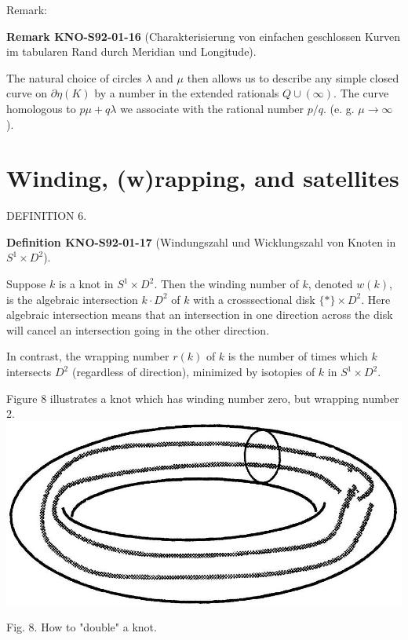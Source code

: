 \documentclass[10pt, letterpaper]{article}
\newcommand{\CustomHeading}[3]{%
  \par\medskip\noindent%
  \textbf{#1 #2} \textnormal{(#3)}.\enskip%
}
\newenvironment{DEF}[2]{\begin{unitbox}\CustomHeading{Definition}{#1}{#2}}{\end{unitbox}}
\newenvironment{REM}[2]{\begin{unitbox}\CustomHeading{Remark}{#1}{#2}}{\end{unitbox}}
\begin{document}
Remark: 

\begin{REM}{KNO-S92-01-16}{Charakterisierung von einfachen geschlossen Kurven im tabularen Rand durch Meridian und Longitude}
The natural choice of circles $\lambda$ and $\mu$ then allows us to describe any simple closed curve on $\partial \eta(K)$ by a number in the extended rationals $Q \cup(\infty)$. The curve homologous to $p \mu+q \lambda$ we associate with the rational number $p / q$. (e. g. $\mu \rightarrow \infty$ ).
\end{REM}



\section{Winding, (w)rapping, and satellites}


DEFINITION 6. 

\begin{DEF}{KNO-S92-01-17}{Windungszahl und Wicklungszahl von Knoten in $S^1\times D^2$}
Suppose $k$ is a knot in $S^{1} \times D^{2}$. Then the winding number of $k$, denoted $w(k)$, is the algebraic intersection $k \cdot D^{2}$ of $k$ with a crosssectional disk $\{*\} \times D^{2}$. Here algebraic intersection means that an intersection in one direction across the disk will cancel an intersection going in the other direction. 

In contrast, the wrapping number $r(k)$ of $k$ is the number of times which $k$ intersects $D^{2}$ (regardless of direction), minimized by isotopies of $k$ in $S^{1} \times D^{2}$.
\end{DEF}

Figure 8 illustrates a knot which has winding number zero, but wrapping number 2.\\
\includegraphics[scale=0.2, center]{2025_05_21_037de704f595ce642d3eg-081}

Fig. 8. How to "double" a knot.
\end{document}
